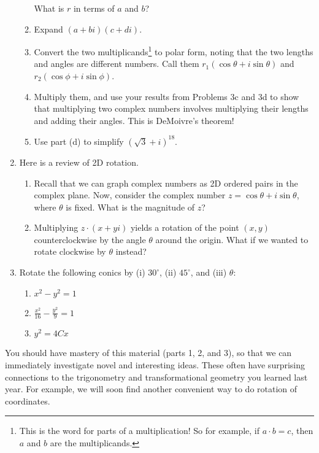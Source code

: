 \documentclass[../gatm.tex]{subfiles}
\begin{document}
\begin{enumerate}
\begin{enumerate}
What is $r$ in terms of $a$ and $b$?
\item Expand $(a+bi)(c+di)$.
\item Convert the two multiplicands\footnote{This is the word for parts of a multiplication! So for example, if $a\cdot b=c$, then $a$ and $b$ are the multiplicands.} to polar form, noting that the two lengths and angles are different numbers. Call them $r_1(\cos\theta + i\sin\theta)$ and $r_2(\cos\phi + i\sin\phi)$.
\item Multiply them, and use your results from Problems 3c and 3d to show that multiplying two complex numbers involves multiplying their lengths and adding their angles. This is DeMoivre's theorem!
\item Use part (d) to simplify $(\sqrt{3}+i)^{18}$.
\end{enumerate}
\item Here is a review of 2D rotation.
\begin{enumerate}
\item Recall that we can graph complex numbers as 2D ordered pairs in the complex plane. Now, consider the complex number $z=\cos \theta + i\sin\theta$, where $\theta$ is fixed. What is the magnitude of $z$?
\item Multiplying $z\cdot(x+yi)$ yields a rotation of the point $(x,y)$ counterclockwise by the angle $\theta$ around the origin. What if we wanted to rotate clockwise by $\theta$ instead?
\end{enumerate}
\item Rotate the following conics by (i) $30^\circ$, (ii) $45^\circ$, and (iii) $\theta$:
\begin{multicols}{3}
\begin{enumerate}
\item $x^2-y^2=1$
\item $\frac{x^2}{16}-\frac{y^2}{9}=1$
\item $y^2=4Cx$
\end{enumerate}
\end{multicols}
\end{enumerate}

You should have mastery of this material (parts 1, 2, and 3), so that we can immediately investigate novel and interesting ideas. These often have surprising connections to the trigonometry and transformational geometry you learned last year. For example, we will soon find another convenient way to do rotation of coordinates.
\end{document}
